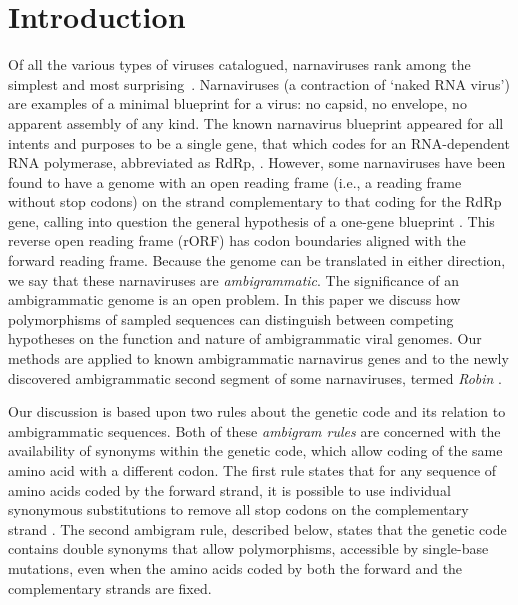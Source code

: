 \documentclass[unnumsec,webpdf,contemporary,large,namedate]{oup-authoring-template}%
\theoremstyle{thmstyleone}%
\theoremstyle{thmstyletwo}%
\theoremstyle{thmstylethree}%
\begin{document}
\maketitle


\section{Introduction}
\label{sec: 1}
Of all the various types of viruses catalogued, narnaviruses rank among the simplest
and most surprising~\citep{Cob+16}.  Narnaviruses (a contraction of \lq naked RNA virus')
are examples of a minimal blueprint for a virus: no capsid, no envelope, no apparent
assembly of any kind. The known narnavirus blueprint appeared for all intents and purposes 
to be a single gene, that which codes for an RNA-dependent RNA polymerase,
abbreviated as RdRp, \citep{Hillman2013}. However, some narnaviruses
have been found to have a genome with an open reading frame (i.e., a reading frame without
stop codons) on the strand complementary to that coding for the RdRp gene, calling into 
question the general hypothesis of a one-gene blueprint .
This reverse open reading frame (rORF) has codon boundaries aligned with the forward reading
frame. Because the genome can be translated in either direction, we say that these narnaviruses
are \emph{ambigrammatic}. The significance of an ambigrammatic genome is an open problem.
In this paper we discuss how polymorphisms of sampled sequences can distinguish
between competing hypotheses on the function and nature of ambigrammatic viral genomes.
Our methods are applied to known ambigrammatic narnavirus genes and to the newly
discovered ambigrammatic second segment of some narnaviruses, termed \emph{Robin} \citep{Bat+20}.

Our discussion is based upon two rules about the genetic code and its relation to ambigrammatic
sequences. Both of these \emph{ambigram rules} are concerned with the availability of synonyms within
the genetic code, which allow coding of the same amino acid with a different codon.
The first rule states that for any sequence of amino acids coded by the forward strand,
it is possible to use individual synonymous substitutions to remove
all stop codons on the complementary strand \citep[this result was discussed already in][]{DeR+19}.
The second ambigram rule, described below, states that the genetic code contains double
synonyms that allow polymorphisms, accessible by single-base mutations, even when the
amino acids coded by both the forward and the complementary strands are fixed.
\end{document}
